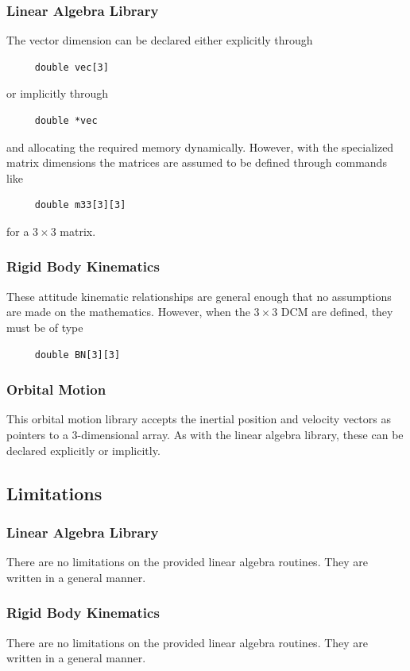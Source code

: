 \subsubsection{Linear Algebra Library}
The vector dimension can be declared either explicitly through
\begin{verbatim}
     double vec[3]
\end{verbatim}
or implicitly through
\begin{verbatim}
     double *vec
\end{verbatim}
and allocating the required memory dynamically.   However, with the specialized matrix dimensions the matrices are assumed to be defined through commands like
\begin{verbatim}
     double m33[3][3]
\end{verbatim}
 for a $3\times 3$ matrix.

\subsubsection{Rigid Body Kinematics}
These attitude kinematic relationships are general enough that no assumptions are made on the mathematics.  However, when the $3\times 3$ DCM are defined, they must be of type
\begin{verbatim}
     double BN[3][3]
\end{verbatim}


\subsubsection{Orbital Motion}
This orbital motion library accepts the inertial position and velocity vectors as pointers to a 3-dimensional array.  As with the linear algebra library, these can be declared explicitly or implicitly.


\subsection{Limitations}
\subsubsection{Linear Algebra Library}
There are no limitations on the provided linear algebra routines.  They are written in a general manner.

\subsubsection{Rigid Body Kinematics}
There are no limitations on the provided linear algebra routines.  They are written in a general manner.

